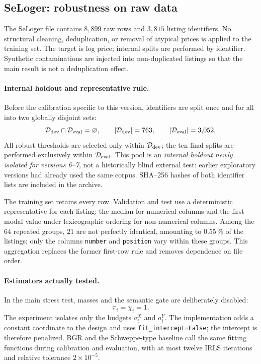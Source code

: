 \subsection{SeLoger: robustness on raw data}
\label{subsec:seloger}
The SeLoger file contains $8{,}899$ raw rows and $3{,}815$ listing identifiers. No structural cleaning, deduplication, or removal of atypical prices is applied to the training set. The target is log price; internal splits are performed by identifier. Synthetic contaminations are injected into non-duplicated listings so that the main result is not a deduplication effect.

\paragraph{Internal holdout and representative rule.}
Before the calibration specific to this version, identifiers are split once and for all into two globally disjoint sets:
\[
\mathcal D_{\rm dev}\cap\mathcal D_{\rm eval}=\varnothing,
\qquad
|\mathcal D_{\rm dev}|=763,
\qquad
|\mathcal D_{\rm eval}|=3{,}052.
\]
All robust thresholds are selected only within $\mathcal D_{\rm dev}$; the ten final splits are performed exclusively within $\mathcal D_{\rm eval}$. This pool is an \emph{internal holdout newly isolated for versions 6--7}, not a historically blind external test: earlier exploratory versions had already used the same corpus. SHA--256 hashes of both identifier lists are included in the archive.

The training set retains every row. Validation and test use a deterministic representative for each listing: the median for numerical columns and the first modal value under lexicographic ordering for non-numerical columns. Among the $64$ repeated groups, $21$ are not perfectly identical, amounting to $0.55\,\%$ of the listings; only the columns \texttt{number} and \texttt{position} vary within these groups. This aggregation replaces the former first-row rule and removes dependence on file order.

\paragraph{Estimators actually tested.}
In the main stress test, masses and the semantic gate are deliberately disabled:
\[
\boxed{\pi_i=\chi_i=1.}
\]
The experiment isolates only the budgets $a_i^X$ and $a_i^Y$. The implementation adds a constant coordinate to the design and uses \texttt{fit\_intercept=False}; the intercept is therefore penalized. BGR and the Schweppe-type baseline call the same fitting functions during calibration and evaluation, with at most twelve IRLS iterations and relative tolerance $2\times10^{-5}$.

